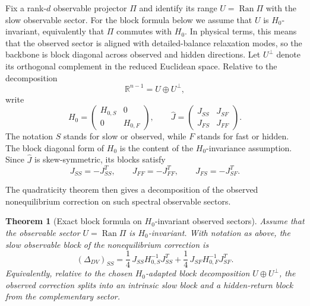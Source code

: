 \documentclass[11pt,a4paper]{article}
\numberwithin{equation}{section}
\theoremstyle{thmcompact}
\newtheorem{theorem}{Theorem}[section]
\theoremstyle{remark}
\begin{document}
Fix a rank-\(d\) observable projector \(\Pi\) and identify its range \(U=\operatorname{Ran}\Pi\) with the slow observable sector. For the block formula below we assume that \(U\) is \(H_0\)-invariant, equivalently that \(\Pi\) commutes with \(H_0\). In physical terms, this means that the observed sector is aligned with detailed-balance relaxation modes, so the backbone is block diagonal across observed and hidden directions. Let \(U^\perp\) denote its orthogonal complement in the reduced Euclidean space. Relative to the decomposition
\begin{equation}
\mathbb R^{n-1}=U\oplus U^\perp,
\end{equation}
write
\begin{equation}
H_0=
\begin{pmatrix}
H_{0,S} & 0\\
0 & H_{0,F}
\end{pmatrix},
\qquad
\widehat J=
\begin{pmatrix}
J_{SS} & J_{SF}\\
J_{FS} & J_{FF}
\end{pmatrix}.
\end{equation}
The notation \(S\) stands for slow or observed, while \(F\) stands for fast or hidden. The block diagonal form of \(H_0\) is the content of the \(H_0\)-invariance assumption. Since \(\widehat J\) is skew-symmetric, its blocks satisfy
\begin{equation}
J_{SS}=-J_{SS}^T,
\qquad
J_{FF}=-J_{FF}^T,
\qquad
J_{FS}=-J_{SF}^T.
\end{equation}

The quadraticity theorem then gives a decomposition of the observed nonequilibrium correction on such spectral observable sectors.

\begin{theorem}[Exact block formula on \(H_0\)-invariant observed sectors]
\label{thm:exact_converter_formula}
Assume that the observable sector \(U=\operatorname{Ran}\Pi\) is \(H_0\)-invariant. With notation as above, the slow observable block of the nonequilibrium correction is
\begin{equation}
(\Delta_{DV})_{SS}
=
\frac14\,J_{SS}H_{0,S}^{-1}J_{SS}^{T}
+
\frac14\,J_{SF}H_{0,F}^{-1}J_{SF}^{T}.
\end{equation}
Equivalently, relative to the chosen \(H_0\)-adapted block decomposition \(U\oplus U^\perp\), the observed correction splits into an intrinsic slow block and a hidden-return block from the complementary sector.
\end{theorem}
\end{document}

